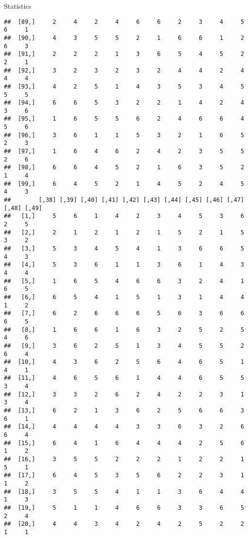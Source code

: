 \documentclass[
  ignorenonframetext,
]{beamer}
\begin{document}
\begin{frame}[fragile]{Statistics}
\begin{verbatim}
##  [89,]     2     4     2     4     6     6     2     3     4     5     6     1
##  [90,]     4     3     5     5     2     1     6     6     1     2     6     3
##  [91,]     2     2     2     1     3     6     5     4     5     2     2     1
##  [92,]     3     2     3     2     3     2     4     4     2     4     4     4
##  [93,]     4     2     5     1     4     3     5     3     4     5     5     5
##  [94,]     6     6     5     3     2     2     1     4     2     4     3     6
##  [95,]     1     6     5     5     6     2     4     6     6     4     5     6
##  [96,]     3     6     1     1     5     3     2     1     6     5     2     3
##  [97,]     1     6     4     6     2     4     2     3     5     5     2     6
##  [98,]     6     6     4     5     2     1     6     3     5     2     1     4
##  [99,]     6     4     5     2     1     4     5     2     4     5     4     3
##        [,38] [,39] [,40] [,41] [,42] [,43] [,44] [,45] [,46] [,47] [,48] [,49]
##   [1,]     5     6     1     4     2     3     4     5     3     6     2     5
##   [2,]     2     1     2     1     2     1     5     2     1     5     3     2
##   [3,]     5     3     4     5     4     1     3     6     6     5     4     3
##   [4,]     5     3     6     1     1     3     6     1     4     3     4     4
##   [5,]     1     6     5     4     6     6     3     2     4     1     6     5
##   [6,]     6     5     4     1     5     1     3     1     4     4     1     2
##   [7,]     6     2     6     6     6     5     6     3     6     6     6     5
##   [8,]     1     6     6     1     6     3     2     5     2     5     4     6
##   [9,]     3     6     2     5     1     3     4     5     5     2     6     4
##  [10,]     4     3     6     2     5     6     4     6     5     1     4     1
##  [11,]     4     6     5     6     1     4     4     6     5     5     3     4
##  [12,]     3     3     2     6     2     4     2     2     3     1     3     4
##  [13,]     6     2     1     3     6     2     5     6     6     3     6     1
##  [14,]     4     4     4     4     3     3     6     3     2     6     6     4
##  [15,]     6     4     1     6     4     4     4     2     5     6     1     2
##  [16,]     3     5     5     2     2     2     1     2     2     1     5     1
##  [17,]     6     4     5     3     5     6     2     2     3     1     1     2
##  [18,]     3     5     5     4     1     1     3     6     4     4     1     3
##  [19,]     5     1     1     4     6     6     3     3     6     5     2     4
##  [20,]     4     4     3     4     2     4     2     5     2     2     1     1

\end{verbatim}
\end{frame}
\end{document}
